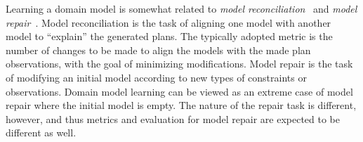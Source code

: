 \documentclass[letterpaper]{article} %
\newif\ifaddcomments
\newcommand{\roni}[1]{\ifaddcomments{\textcolor{red}{[Roni: #1]}}\fi}
\newcommand{\yarin}[1]{\ifaddcomments{\textcolor{teal}{[Yarin: #1]}}\fi}
\newcommand{\leo}[1]{\ifaddcomments{\textcolor{pink}{[Leonardo: #1]}}\fi}
\begin{document}
Learning a domain model is somewhat related to  \emph{model reconciliation}~\citep[inter alia]{ChakrabortiSZK17,SreedharanHMK19} and \emph{model repair}~\citep{bercher2025aSurvey}. 
Model reconciliation is the task of aligning one model with another model to ``explain'' the generated plans. 
The typically adopted metric is 
the number of changes to be made to align the models with the made plan observations, with the goal of minimizing modifications.
Model repair is the task of modifying an initial model according to new types of constraints or observations. Domain model learning can be viewed as an extreme case of model repair where the initial model is empty. 
The nature of the repair task is different, however, and thus metrics and evaluation for model repair are expected to be different as well. 





\end{document}
